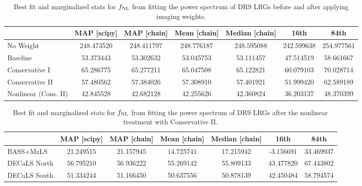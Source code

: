 \begin{table}
  \begin{center}
    \caption{Best fit and marginalized stats for $f_{\rm NL}$ from fitting the power spectrum of DR9 LRGs before and after applying imaging weights.}
    \label{tab:mocksmcmc}
    \begin{tabular}{lcccccc}
    \hline
    \hline
    & MAP [scipy] & MAP [chain]  &	Mean [chain]	& Median [chain] &	16th	& 84th \\
    \hline
No Weight&	248.473520	&248.411797	&248.776187	&248.595088&	242.599638&	254.977561\\
Baseline	&53.373443	&53.302632	&53.045753	&53.111457	&47.514519	&58.661667\\
Conservative I	&65.286775	&65.277211	&65.047508&	65.122821&	60.079103&	70.028714\\
Conservative II	&57.480562	&57.384026	&57.308910&	57.401921&	51.999420&	62.589189\\
Nonlinear (Cons. II)	&42.845528	&42.682128	&42.255626&	42.360824&	36.203137&	48.370399

    \end{tabular}
  \end{center}
\end{table}


\begin{table}
  \begin{center}
    \caption{Best fit and marginalized stats for $f_{\rm NL}$ from fitting the power spectrum of DR9 LRGs after the nonlinear treatment with Conservative II.}
    \label{tab:mocksmcmc}
    \begin{tabular}{lcccccc}
    \hline
    \hline
    & MAP [scipy] & MAP [chain]  &	Mean [chain]	& Median [chain] &	16th	& 84th \\
    \hline
BASS+MzLS&	21.249515&	21.157945&	14.725741&	17.215942&	-3.156691&	33.469937\\
DECaLS North&	56.795210&	56.936222&	55.269142&	55.809133&	43.477820&	67.443802\\
DECaLS South &	51.334244&	51.166450&	50.637556&	50.878139&	42.450484&	58.794574
    \end{tabular}
  \end{center}
\end{table}




%
